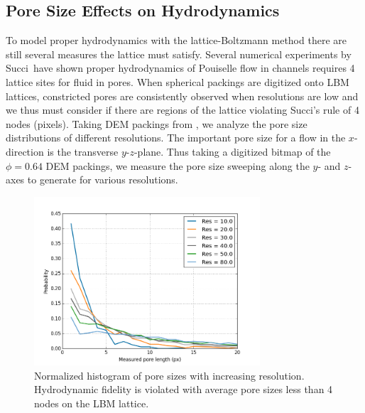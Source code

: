 \subsection{Pore Size Effects on Hydrodynamics}
To model proper hydrodynamics with the lattice-Boltzmann method there are still several measures the lattice must satisfy. Several numerical experiments by Succi\etal~have shown proper hydrodynamics of Pouiselle flow in channels requires 4 lattice sites for fluid in pores.\cite{succi2001lattice} When spherical packings are digitized onto LBM lattices, constricted pores are consistently observed when resolutions are low and we thus must consider if there are regions of the lattice violating Succi's rule of 4 nodes (pixels). Taking DEM packings from , we analyze the pore size distributions of different resolutions. The important pore size for a flow in the $x$-direction is the transverse $y$-$z$-plane. Thus taking a digitized bitmap of the $\phi = 0.64$  DEM packings, we measure the pore size sweeping along the $y$- and $z$-axes to generate  for various resolutions. 

\begin{figure}[h]
    \centering
    \includegraphics[width=0.75\textwidth]{figures/lbm/res-pore-sizes}
    \caption{Normalized histogram of pore sizes with increasing resolution. Hydrodynamic fidelity is violated with average pore sizes less than 4 nodes on the LBM lattice.}\label{fig:res-pore-sizes}
\end{figure}

